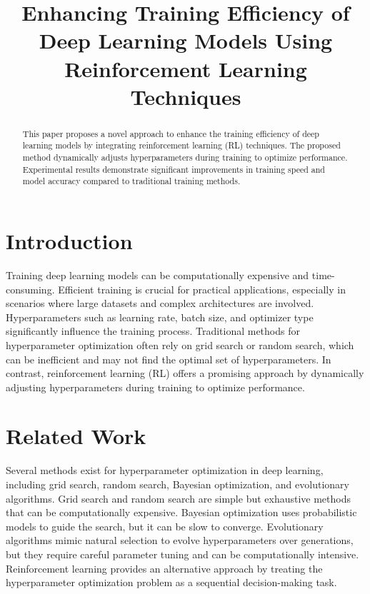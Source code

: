 \documentclass{article}
\title{Enhancing Training Efficiency of Deep Learning Models Using Reinforcement Learning Techniques}
\author{}
\date{}
\begin{document}
\maketitle

\begin{abstract}
This paper proposes a novel approach to enhance the training efficiency of deep learning models by integrating reinforcement learning (RL) techniques. The proposed method dynamically adjusts hyperparameters during training to optimize performance. Experimental results demonstrate significant improvements in training speed and model accuracy compared to traditional training methods.
\end{abstract}

\section{Introduction}
Training deep learning models can be computationally expensive and time-consuming. Efficient training is crucial for practical applications, especially in scenarios where large datasets and complex architectures are involved. Hyperparameters such as learning rate, batch size, and optimizer type significantly influence the training process. Traditional methods for hyperparameter optimization often rely on grid search or random search, which can be inefficient and may not find the optimal set of hyperparameters. In contrast, reinforcement learning (RL) offers a promising approach by dynamically adjusting hyperparameters during training to optimize performance.

\section{Related Work}
Several methods exist for hyperparameter optimization in deep learning, including grid search, random search, Bayesian optimization, and evolutionary algorithms. Grid search and random search are simple but exhaustive methods that can be computationally expensive. Bayesian optimization uses probabilistic models to guide the search, but it can be slow to converge. Evolutionary algorithms mimic natural selection to evolve hyperparameters over generations, but they require careful parameter tuning and can be computationally intensive. Reinforcement learning provides an alternative approach by treating the hyperparameter optimization problem as a sequential decision-making task.
\end{document}
